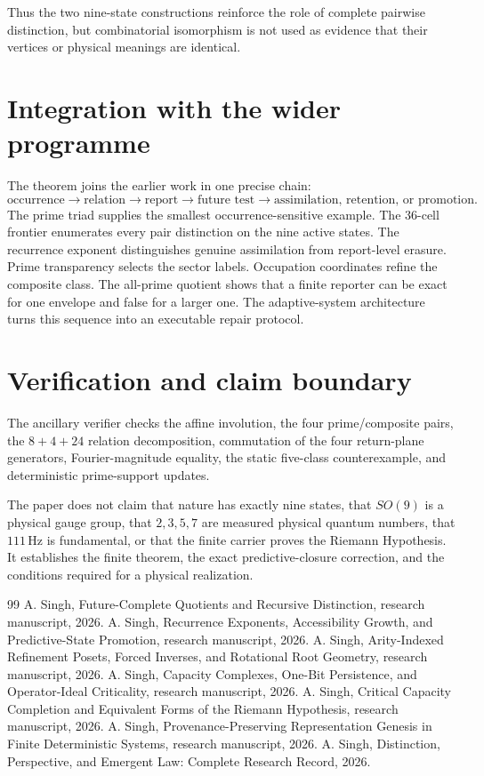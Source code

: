 \documentclass[11pt,a4paper]{article}
\begin{document}
Thus the two nine-state constructions reinforce the role of complete pairwise distinction, but combinatorial isomorphism is not used as evidence that their vertices or physical meanings are identical.

\section{Integration with the wider programme}
The theorem joins the earlier work in one precise chain:
\begin{equation}
\text{occurrence}\to\text{relation}\to\text{report}\to\text{future test}\to\text{assimilation, retention, or promotion}.
\end{equation}
The prime triad supplies the smallest occurrence-sensitive example. The 36-cell frontier enumerates every pair distinction on the nine active states. The recurrence exponent distinguishes genuine assimilation from report-level erasure. Prime transparency selects the sector labels. Occupation coordinates refine the composite class. The all-prime quotient shows that a finite reporter can be exact for one envelope and false for a larger one. The adaptive-system architecture turns this sequence into an executable repair protocol.

\section{Verification and claim boundary}
The ancillary verifier checks the affine involution, the four prime/composite pairs, the $8+4+24$ relation decomposition, commutation of the four return-plane generators, Fourier-magnitude equality, the static five-class counterexample, and deterministic prime-support updates.

The paper does not claim that nature has exactly nine states, that $SO(9)$ is a physical gauge group, that $2,3,5,7$ are measured physical quantum numbers, that $111\,\mathrm{Hz}$ is fundamental, or that the finite carrier proves the Riemann Hypothesis. It establishes the finite theorem, the exact predictive-closure correction, and the conditions required for a physical realization.


\begin{thebibliography}{99}
 A. Singh, Future-Complete Quotients and Recursive Distinction, research manuscript, 2026.
 A. Singh, Recurrence Exponents, Accessibility Growth, and Predictive-State Promotion, research manuscript, 2026.
 A. Singh, Arity-Indexed Refinement Posets, Forced Inverses, and Rotational Root Geometry, research manuscript, 2026.
 A. Singh, Capacity Complexes, One-Bit Persistence, and Operator-Ideal Criticality, research manuscript, 2026.
 A. Singh, Critical Capacity Completion and Equivalent Forms of the Riemann Hypothesis, research manuscript, 2026.
 A. Singh, Provenance-Preserving Representation Genesis in Finite Deterministic Systems, research manuscript, 2026.
 A. Singh, Distinction, Perspective, and Emergent Law: Complete Research Record, 2026.
\end{thebibliography}
\end{document}
